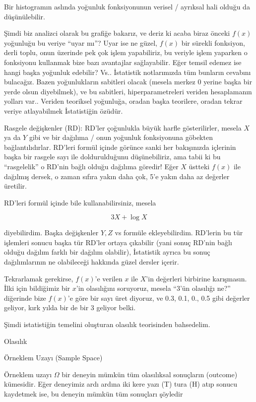 \documentclass[12pt,fleqn]{article}\usepackage{../../common}
\begin{document}
Bir histogramın aslında yoğunluk fonksiyonunun verisel / ayrıksal hali
olduğu da düşünülebilir.

Şimdi biz analizci olarak bu grafiğe bakarız, ve deriz ki acaba biraz
önceki $f(x)$ yoğunluğu bu veriye ``uyar mı''? Uyar ise ne güzel, $f(x)$
bir sürekli fonksiyon, derli toplu, onun üzerinde pek çok işlem
yapabiliriz, bu veriyle işlem yaparken o fonksiyonu kullanmak bize bazı
avantajlar sağlayabilir. Eğer temsil edemez ise hangi başka yoğunluk
edebilir?  Vs..  İstatistik notlarımızda tüm bunların cevabını
bulacağız. Bazen yoğunlukların sabitleri olacak (mesela merkez 0 yerine
başka bir yerde olsun diyebilmek), ve bu sabitleri, hiperparametreleri
veriden hesaplamanın yolları var.. Veriden teoriksel yoğunluğa, oradan
başka teorilere, oradan tekrar veriye atlayabilmek İstatistiğin özüdür.

Rasgele değişkenler (RD): RD'ler çoğunlukla büyük harfle gösterilirler,
mesela $X$ ya da $Y$ gibi ve bir dağılıma / onun yoğunluk fonksiyonuna
göbekten bağlantılıdırlar. RD'leri formül içinde görünce sanki her
bakışınızda içlerinin başka bir rasgele sayı ile doldurulduğunu
düşünebiliriz, ama tabii ki bu ``rasgelelik'' o RD'nin bağlı olduğu
dağılıma göredir! Eğer $X$ üstteki $f(x)$ ile dağılmış dersek, o zaman
sıfıra yakın daha çok, 5'e yakın daha az değerler üretilir.

RD'leri formül içinde bile kullanabilirsiniz, mesela 

$$ 3X + \log X $$ 

diyebilirdim. Başka değişkenler $Y,Z$ vs formüle ekleyebilirdim. RD'lerin
bu tür işlemleri sonucu başka tür RD'ler ortaya çıkabilir (yani sonuç
RD'nin bağlı olduğu dağılım farklı bir dağılım olabilir), İstatistik ayrıca
bu sonuç dağılımlarının ne olabileceği hakkında güzel dersler içerir.

Tekrarlamak gerekirse, $f(x)$'e verilen $x$ ile $X$'in değerleri birbirine
karışmasın. İlki için bildiğimiz bir $x$'in olasılığını soruyoruz, mesela
``3'ün olasılığı ne?'' diğerinde bize $f(x)$'e göre bir sayı üret diyoruz,
ve 0.3, 0.1, 0., 0.5 gibi değerler geliyor, kırk yılda bir de bir 3 geliyor
belki.

Şimdi istatistiğin temelini oluşturan olasılık teorisinden bahsedelim.

Olasılık

Örneklem Uzayı (Sample Space)

Örneklem uzayı $\Omega$ bir deneyin mümkün tüm olasılıksal sonuçların
(outcome) kümesidir. Eğer deneyimiz ardı ardına iki kere yazı (T) tura (H)
atıp sonucu kaydetmek ise, bu deneyin mümkün tüm sonuçları şöyledir
\end{document}
